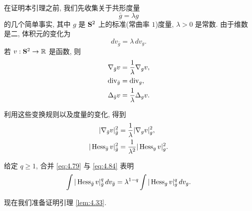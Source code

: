 在证明本引理之前, 我们先收集关于共形度量
\begin{equation*}
\bar{g}=\lambda g
\end{equation*}
的几个简单事实, 其中 $g$ 是 $\mathbf{S}^2$ 上的标准(常曲率 $1$)度量,
$\lambda>0$ 是常数. 由于维数是二, 体积元的变化为
\begin{equation}
dv_{\bar{g}}=\lambda\,dv_g.
\label{eq:4.79}
\end{equation}
若 $v:\mathbf{S}^2\to\mathbb{R}$ 是函数, 则
\begin{align}
\nabla_{\bar{g}}v&=\frac1\lambda\nabla_gv,\label{eq:4.80}\\
\operatorname{div}_{\bar{g}}&=\operatorname{div}_g,\label{eq:4.81}\\
\Delta_{\bar{g}}v&=\frac1\lambda\Delta_gv.\label{eq:4.82}
\end{align}

利用这些变换规则以及度量的变化, 得到
\begin{align}
|\nabla_{\bar{g}}v|_{\bar{g}}^2&=\frac1\lambda|\nabla_gv|_g^2,\label{eq:4.83}\\
|\operatorname{Hess}_{\bar{g}}v|_{\bar{g}}^2&=\frac1{\lambda^2}|\operatorname{Hess}_gv|_g^2.\label{eq:4.84}
\end{align}

给定 $q\geq1$, 合并 \eqref{eq:4.79} 与 \eqref{eq:4.84} 表明
\begin{equation}
\int|\operatorname{Hess}_{\bar{g}}v|_{\bar{g}}^q\,dv_{\bar{g}}
 =\lambda^{1-q}\int|\operatorname{Hess}_gv|_g^q\,dv_g.
\label{eq:4.85}
\end{equation}

现在我们准备证明引理 \ref{lem:4.33}.

